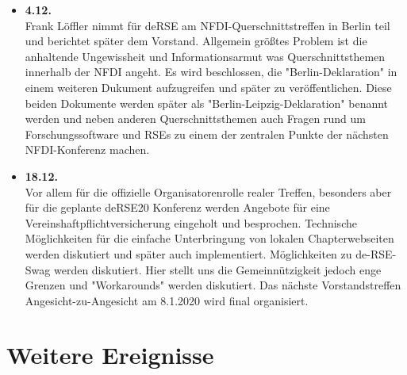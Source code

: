 \begin{itemize}
 \item \textbf{4.12.}\\
 Frank Löffler nimmt für deRSE am NFDI-Querschnittstreffen in Berlin teil und berichtet später dem Vorstand. Allgemein größtes Problem ist die anhaltende Ungewissheit und Informationsarmut was Querschnittsthemen innerhalb der NFDI angeht. Es wird beschlossen, die "Berlin-Deklaration" in einem weiteren Dukument aufzugreifen und später zu veröffentlichen. Diese beiden Dokumente werden später als "Berlin-Leipzig-Deklaration" benannt werden und neben anderen Querschnittsthemen auch Fragen rund um Forschungssoftware und RSEs zu einem der zentralen Punkte der nächsten NFDI-Konferenz machen.

 \item \textbf{18.12.}\\
 Vor allem für die offizielle Organisatorenrolle realer Treffen, besonders aber für die geplante deRSE20 Konferenz werden Angebote für eine Vereinshaftpflichtversicherung eingeholt und besprochen. Technische Möglichkeiten für die einfache Unterbringung von lokalen Chapterwebseiten werden diskutiert und später auch implementiert. Möglichkeiten zu de-RSE-Swag werden diskutiert. Hier stellt uns die Gemeinnützigkeit jedoch enge Grenzen und "Workarounds" werden diskutiert. Das nächste Vorstandstreffen Angesicht-zu-Angesicht am 8.1.2020 wird final organisiert.

\end{itemize}
\section{Weitere Ereignisse}

